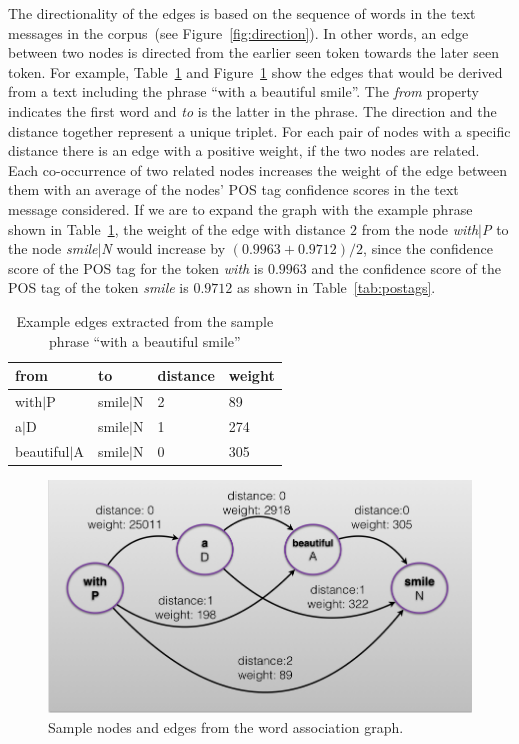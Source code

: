\documentclass[a4paper,onesided,12pt]{report}
\begin{document}
The directionality of the edges is based  on the sequence of words in the text messages in the corpus~(see Figure~\ref{fig:direction}). In other words, an edge between two nodes is directed from the earlier seen token towards the later seen token. For example, Table~\ref{tab:edges} and Figure~\ref{fig:edges} show the edges that would be derived from a text including the phrase ``with a beautiful smile''. The \textit{from} property indicates the first word and \textit{to} is the latter in the phrase. The direction and the distance together represent a unique triplet. For each pair of nodes with a specific distance there is an edge with a positive weight, if the two nodes are related. Each co-occurrence of two related nodes increases the weight of the edge between them with an average of the nodes' POS tag confidence scores in the text message considered. If we are to expand the graph with the example phrase shown in Table~\ref{tab:edges}, the weight of the edge with distance $2$ from the node \emph{with$|$P}  to the node  \emph{smile$|$N} would increase by $(0.9963+0.9712)/2$, since the confidence score of the POS tag for the token \emph{with} is  $0.9963$ and the confidence score of the POS tag of the token \emph{smile} is $0.9712$ as shown in Table~\ref{tab:postags}.

\begin{table}[hbt]
  \caption{Example edges extracted from the sample phrase  ``with a beautiful smile''}
  \centering
  \begin{tabular}[tc]{|l|l|l|l|}
    \hline
from & to & distance & weight \\
\hline
 with$|$P &  smile$|$N & 2 & 89 \\
 a$|$D & smile$|$N & 1 & 274 \\
 beautiful$|$A & smile$|$N & 0 & 305 \\
    \hline
\end{tabular}
\label{tab:edges}
\end{table}

\begin{figure}[htb]
\begin{center}
\includegraphics[scale=0.5]{fig/edges}
\caption{Sample nodes and edges from the word association graph.}
\label{fig:edges}
\end{center}
\end{figure}
\end{document}
